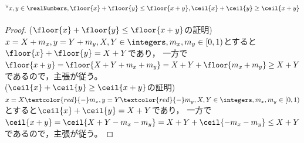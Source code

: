         \subsection{\texorpdfstring{$^\forall x,y\in\realNumbers,\floor{x}+\floor{y}\leq\floor{x+y},\ceil{x}+\ceil{y}\geq\ceil{x+y}$}{∀x,y∈R, floor(x)+floor(y) ≤ floor(x+y), ceil(x)+ceil(y) ≥ ceil(x+y)}}
            \begin{proof}
                ($\floor{x}+\floor{y}\leq\floor{x+y}$の証明)\\
                $x=X+m_x,y=Y+m_y,X,Y\in\integers,m_x,m_y\in[0,1)$とすると$\floor{x}+\floor{y} = X+Y$であり，
                一方で$\floor{x+y} = \floor{X+Y+m_x+m_y} = X+Y + \floor{m_x+m_y} \geq X+Y$であるので，主張が従う。\\
                \newline
                ($\ceil{x}+\ceil{y}\geq\ceil{x+y}$の証明)\\
                $x=X\textcolor{red}{-}m_x,y=Y\textcolor{red}{-}m_y,X,Y\in\integers,m_x,m_y\in[0,1)$とすると$\ceil{x}+\ceil{y} = X+Y$であり，
                一方で$\ceil{x+y} = \ceil{X+Y-m_x-m_y} = X+Y + \ceil{-m_x-m_y} \leq X+Y$であるので，主張が従う。
            \end{proof}
